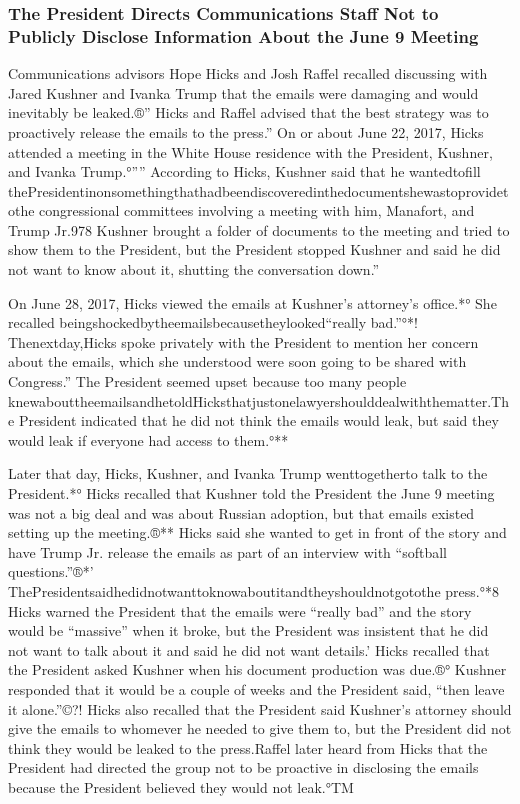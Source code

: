 \subsubsection{The President Directs Communications Staff Not to Publicly Disclose Information About the June 9 Meeting}

Communications advisors Hope Hicks and Josh Raffel recalled discussing with Jared Kushner and Ivanka Trump that the emails were damaging and would inevitably be leaked.®” Hicks and Raffel advised that the best strategy was to proactively release the emails to the press.” On or about June 22, 2017, Hicks attended a meeting in the White House residence with the President, Kushner, and Ivanka Trump.°”” According to Hicks, Kushner said that he wantedtofill thePresidentinonsomethingthathadbeendiscoveredinthedocumentshewastoprovidetothe congressional committees involving a meeting with him, Manafort, and Trump Jr.978 Kushner brought a folder of documents to the meeting and tried to show them to the President, but the President stopped Kushner and said he did not want to know about it, shutting the conversation down.”

On June 28, 2017, Hicks viewed the emails at Kushner's attorney's office.*° She recalled beingshockedbytheemailsbecausetheylooked“really bad.”°*! Thenextday,Hicks spoke privately with the President to mention her concern about the emails, which she understood were soon going to be shared with Congress.” The President seemed upset because too many people knewabouttheemailsandhetoldHicksthatjustonelawyershoulddealwiththematter.The President indicated that he did not think the emails would leak, but said they would leak if everyone had access to them.°**

Later that day, Hicks, Kushner, and Ivanka Trump wenttogetherto talk to the President.*° Hicks recalled that Kushner told the President the June 9 meeting was not a big deal and was about Russian adoption, but that emails existed setting up the meeting.®** Hicks said she wanted to get in front of the story and have Trump Jr. release the emails as part of an interview with “softball questions.”®*' ThePresidentsaidhedidnotwanttoknowaboutitandtheyshouldnotgotothe press.°*8 Hicks warned the President that the emails were “really bad” and the story would be “massive” when it broke, but the President was insistent that he did not want to talk about it and said he did not want details.' Hicks recalled that the President asked Kushner when his document production was due.®° Kushner responded that it would be a couple of weeks and the President said, “then leave it alone.”©?! Hicks also recalled that the President said Kushner's attorney should give the emails to whomever he needed to give them to, but the President did not think they would be leaked to the press.Raffel later heard from Hicks that the President had directed the group not to be proactive in disclosing the emails because the President believed they would not leak.°TM

